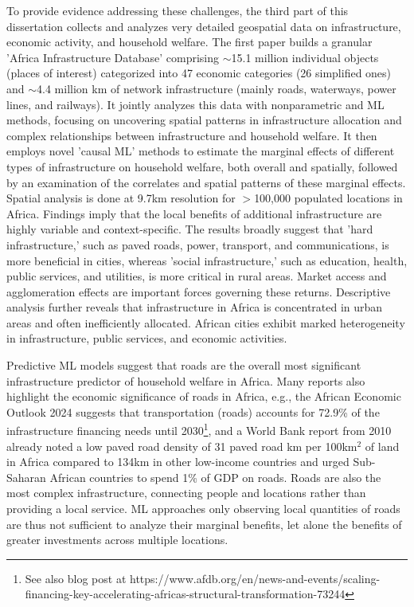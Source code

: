 \documentclass[a4paper]{article}
\begin{document}
To provide evidence addressing these challenges, the third part of this dissertation collects and analyzes very detailed geospatial data on infrastructure, economic activity, and household welfare. The first paper \citep{krantz2023mapping} builds a granular 'Africa Infrastructure Database' comprising $\sim$15.1 million individual objects (places of interest) categorized into 47 economic categories (26 simplified ones) and $\sim$4.4 million km of network infrastructure (mainly roads, waterways, power lines, and railways). It jointly analyzes this data with nonparametric and ML methods, focusing on uncovering spatial patterns in infrastructure allocation and complex relationships between infrastructure and household welfare. It then employs novel 'causal ML' methods to estimate the marginal effects of different types of infrastructure on household welfare, both overall and spatially, followed by an examination of the correlates and spatial patterns of these marginal effects. Spatial analysis is done at 9.7km resolution for $>$100,000 populated locations in Africa. Findings imply that the local benefits of additional infrastructure are highly variable and context-specific. The results broadly suggest that 'hard infrastructure,' such as paved roads, power, transport, and communications, is more beneficial in cities, whereas 'social infrastructure,' such as education, health, public services, and utilities, is more critical in rural areas. Market access and agglomeration effects are important forces governing these returns. Descriptive analysis further reveals that infrastructure in Africa is concentrated in urban areas and often inefficiently allocated. African cities exhibit marked heterogeneity in infrastructure, public services, and economic activities. \newline 

Predictive ML models suggest that roads are the overall most significant infrastructure predictor of household welfare in Africa. Many reports also highlight the economic significance of roads in Africa, e.g., the African Economic Outlook 2024 \citep{african2024driving} suggests that transportation (roads) accounts for 72.9\% of the infrastructure financing needs until 2030\footnote{See also blog post at https://www.afdb.org/en/news-and-events/scaling-financing-key-accelerating-africas-structural-transformation-73244}, and a World Bank report from 2010 \citep{foster2010africa} already noted a low paved road density of 31 paved road km per 100km$^2$ of land in Africa compared to 134km in other low-income countries and urged Sub-Saharan African countries to spend 1\% of GDP on roads. Roads are also the most complex infrastructure, connecting people and locations rather than providing a local service. ML approaches only observing local quantities of roads are thus not sufficient to analyze their marginal benefits, let alone the benefits of greater investments across multiple locations. \newline
\end{document}
